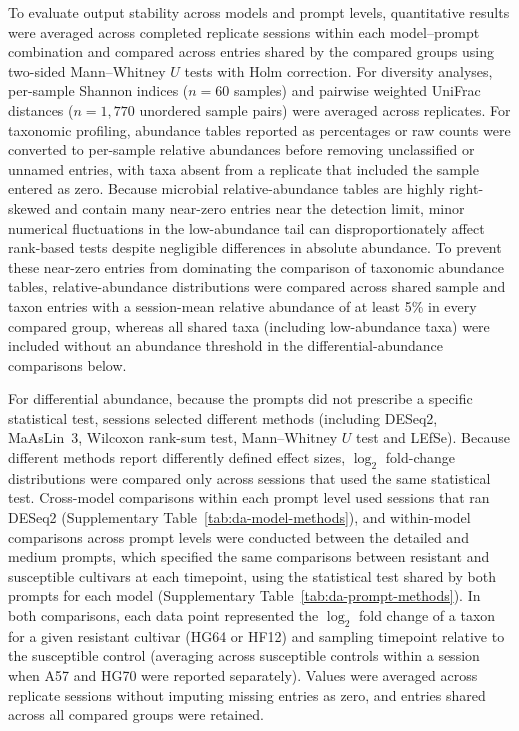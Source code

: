 \documentclass[10pt,letterpaper]{article}
\begin{document}
To evaluate output stability across models and prompt levels, quantitative
results were averaged across completed replicate sessions within each
model--prompt combination and compared across entries shared by the compared
groups using two-sided Mann--Whitney $U$ tests with Holm correction.  For
diversity analyses, per-sample Shannon indices ($n = 60$ samples)
and pairwise weighted UniFrac distances ($n = 1{,}770$ unordered sample
pairs) were averaged across replicates.  For taxonomic profiling, abundance
tables reported as percentages or raw counts were converted to per-sample
relative abundances before removing unclassified or unnamed entries, with taxa
absent from a replicate that included the sample entered as zero.  Because
microbial relative-abundance tables are highly right-skewed and contain many
near-zero entries near the detection limit, minor numerical fluctuations in
the low-abundance tail can disproportionately affect rank-based tests despite
negligible differences in absolute abundance.  To prevent these near-zero
entries from dominating the comparison of taxonomic abundance tables,
relative-abundance distributions were compared across shared sample and taxon
entries with a session-mean relative abundance of at least 5\% in every
compared group, whereas all shared taxa (including low-abundance taxa) were
included without an abundance threshold in the differential-abundance
comparisons below.

For differential abundance, because the prompts did not prescribe a specific
statistical test, sessions selected different methods (including DESeq2,
MaAsLin~3, Wilcoxon rank-sum test, Mann--Whitney $U$ test and LEfSe).
Because different methods report differently defined effect sizes, $\log_2$
fold-change distributions were compared only across sessions that used the
same statistical test.  Cross-model comparisons within each prompt level used sessions that ran
DESeq2 (Supplementary Table~\ref{tab:da-model-methods}), and within-model
comparisons across prompt levels were conducted between the detailed and
medium prompts, which specified the same comparisons between resistant and
susceptible cultivars at each timepoint, using the statistical test shared by
both prompts for each model (Supplementary
Table~\ref{tab:da-prompt-methods}).  In both comparisons, each data point
represented the $\log_2$ fold change of a taxon for a given resistant
cultivar (HG64 or HF12) and sampling timepoint relative to the susceptible
control (averaging across susceptible controls within a session when A57 and
HG70 were reported separately).  Values were averaged across replicate
sessions without imputing missing entries as zero, and entries shared across
all compared groups were retained.
\end{document}
